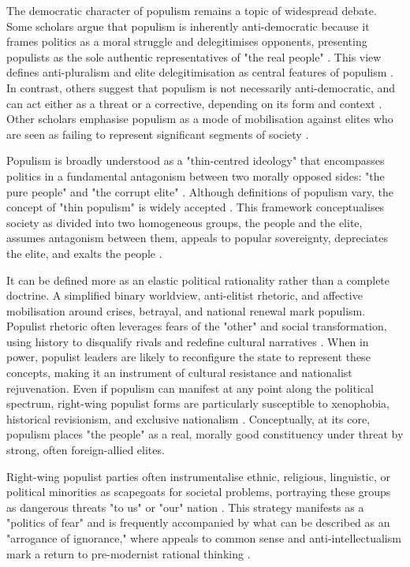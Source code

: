 The democratic character of populism remains a topic of widespread debate. Some scholars argue that populism is inherently anti-democratic because it frames politics as a moral struggle and delegitimises opponents, presenting populists as the sole authentic representatives of "the real people" \citep{muller_what_2016}. This view defines anti-pluralism and elite delegitimisation as central features of populism \citep{pozarlik_momentarily_2022}. In contrast, others suggest that populism is not necessarily anti-democratic, and can act either as a threat or a corrective, depending on its form and context \citep{mudde_populism_2012}. Other scholars emphasise populism as a mode of mobilisation against elites who are seen as failing to represent significant segments of society \citep{urbinati_2019}.

Populism is broadly understood as a "thin-centred ideology" that encompasses politics in a fundamental antagonism between two morally opposed sides: "the pure people" and "the corrupt elite" \citep{couperus_memory_2023}. Although definitions of populism vary, the concept of "thin populism" is widely accepted \citep{mudde_populism_2017}. This framework conceptualises society as divided into two homogeneous groups, the people and the elite, assumes antagonism between them, appeals to popular sovereignty, depreciates the elite, and exalts the people \citep{stanley_thin_2008}.

It can be defined more as an elastic political rationality rather than a complete doctrine. A simplified binary worldview, anti-elitist rhetoric, and affective mobilisation around crises, betrayal, and national renewal mark populism. Populist rhetoric often leverages fears of the "other" and social transformation, using history to disqualify rivals and redefine cultural narratives \citep{zuk_anti-semitic_2023}. When in power, populist leaders are likely to reconfigure the state to represent these concepts, making it an instrument of cultural resistance and nationalist rejuvenation. Even if populism can manifest at any point along the political spectrum, right-wing populist forms are particularly susceptible to xenophobia, historical revisionism, and exclusive nationalism \citep{forchtner_trajectory_2019}. Conceptually, at its core, populism places "the people" as a real, morally good constituency under threat by strong, often foreign-allied elites.

Right-wing populist parties often instrumentalise ethnic, religious, linguistic, or political minorities as scapegoats for societal problems, portraying these groups as dangerous threats "to us" or "our" nation \citep{wodak_politics_2015}. This strategy manifests as a "politics of fear" and is frequently accompanied by what can be described as an "arrogance of ignorance," where appeals to common sense and anti-intellectualism mark a return to pre-modernist rational thinking \citep{wodak__2017}.

